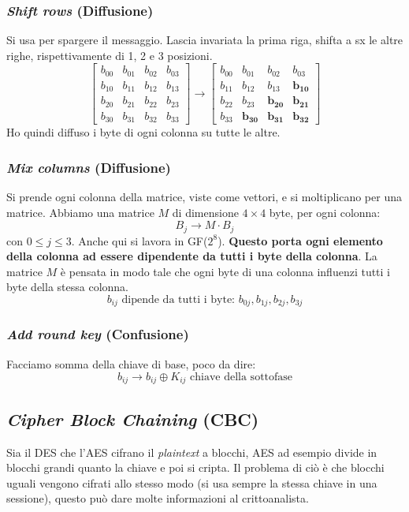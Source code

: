 \subsubsection{\emph{Shift rows} (Diffusione)}
Si usa per spargere il messaggio.
Lascia invariata la prima riga, shifta a sx le altre righe, rispettivamente di 1, 2 e 3 posizioni.
$$
    \begin{bmatrix}
        b_{00} & b_{01} & b_{02} & b_{03} \\
        b_{10} & b_{11} & b_{12} & b_{13} \\
        b_{20} & b_{21} & b_{22} & b_{23} \\
        b_{30} & b_{31} & b_{32} & b_{33}
    \end{bmatrix}
\xrightarrow{}
    \begin{bmatrix}
        b_{00} & b_{01} & b_{02} & b_{03} \\
        b_{11} & b_{12} & b_{13} & \mathbf{b_{10}} \\
         b_{22} & b_{23} & \mathbf{b_{20}} & \mathbf{b_{21}} \\
        b_{33} & \mathbf{b_{30}} & \mathbf{b_{31}} & \mathbf{b_{32}}
    \end{bmatrix}
$$
Ho quindi diffuso i byte di ogni colonna su tutte le altre.

\subsubsection{\emph{Mix columns} (Diffusione)}
Si prende ogni colonna della matrice, viste come vettori, e si moltiplicano per una matrice. Abbiamo una matrice $M$ di dimensione $4 \times 4$ byte, per ogni colonna:
$$
    B_{j} \xrightarrow{} M \cdot B_{j}
$$
con $0 \leq j \leq 3$. Anche qui si lavora in GF($2^8$). \textbf{Questo porta ogni elemento della colonna ad essere dipendente da tutti i byte della colonna}. La matrice $M$ è pensata in modo tale che ogni byte di una colonna influenzi tutti i byte della stessa colonna.
$$b_{ij} \text{ dipende da tutti i byte: $b_{0j}, b_{1j}, b_{2j}, b_{3j}$}$$

\subsubsection{\emph{Add round key} (Confusione)}
Facciamo somma della chiave di base, poco da dire:
$$
    b_{ij} \xrightarrow{} b_{ij} \oplus K_{ij} \text{ chiave della sottofase}
$$


\subsection{\emph{Cipher Block Chaining} (CBC)}
Sia il DES che l'AES cifrano il \textit{plaintext} a blocchi, AES ad esempio divide in blocchi grandi quanto la chiave e poi si cripta. Il problema di ciò è che blocchi uguali vengono cifrati allo stesso modo (si usa sempre la stessa chiave in una sessione), questo può dare molte informazioni al crittoanalista.

